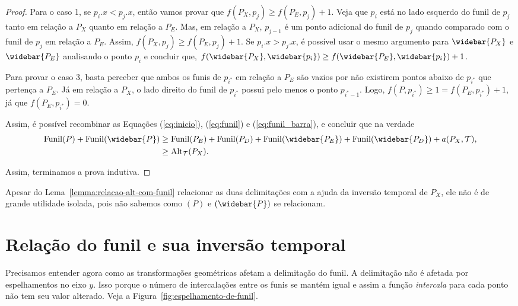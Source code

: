 \begin{proof}
    Para o caso 1, se $p_i.x < p_j.x$, então vamos provar que $f(P_X,p_j) \geq f(P_E,p_j) + 1$. Veja que $p_i$ está no lado esquerdo do funil de $p_j$ tanto em relação a $P_X$ quanto em relação a $P_E$. Mas, em relação a $P_X$, $p_{j-1}$ é um ponto adicional do funil de $p_j$ quando comparado com o funil de $p_j$ em relação a $P_E$. Assim, $f(P_X,p_j) \geq f(P_E,p_j) + 1$.
    Se $p_i.x > p_j.x$, é possível usar o mesmo argumento para $\widebar{P_X}$ e $\widebar{P_E}$ analisando o ponto $p_i$ e concluir que, $f(\widebar{P_X},\widebar{p_i}) \geq f(\widebar{P_E},\widebar{p_i}) + 1$.

    Para provar o caso 3, basta perceber que ambos os funis de $p_{i^{*}}$ em relação a $P_E$ são vazios por não existirem pontos abaixo de $p_{i^{*}}$ que pertença a $P_E$. Já em relação a $P_X$, o lado direito do funil de $p_{i^{*}}$ possui pelo menos o ponto $p_{i^{*} - 1}$. Logo, $f(P,p_{i^{*}}) \geq 1 = f(P_E,p_{i^{*}}) + 1$, já que $f(P_E,p_{i^{*}}) = 0$. 

    Assim, é possível recombinar as Equações (\ref{eq:inicio}), (\ref{eq:funil}) e (\ref{eq:funil_barra}), e concluir que na verdade
    \begin{align*}
        \Funil(P) + \Funil(\widebar{P}) &\geq \Funil(P_E) + \Funil(P_D) + \Funil(\widebar{P_E}) + \Funil(\widebar{P_D}) + a(P_X,\cT), \notag \\
        &\geq \Alt_{\cT}(P_X).
    \end{align*}

    Assim, terminamos a prova indutiva.
\end{proof}

Apesar do Lema~\ref{lemma:relacao-alt-com-funil} relacionar as duas delimitações com a ajuda da inversão temporal de $P_X$, ele não é de grande utilidade isolada, pois não sabemos como \Funil$(P)$ e \Funil$(\widebar{P})$ se relacionam.

\section{Relação do funil e sua inversão temporal}

Precisamos entender agora como as transformações geométricas afetam a delimitação do funil. A delimitação não é afetada por espelhamentos no eixo $y$. Isso porque o número de intercalações entre os funis se mantém igual e assim a função \emph{intercala} para cada ponto não tem seu valor alterado. Veja a Figura~\ref{fig:espelhamento-de-funil}.

